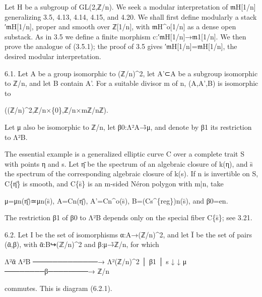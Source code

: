 \documentclass[11pt,a4paper]{article}
\begin{document}
Let H be a subgroup of GL(2,ℤ/n). We seek a modular interpretation of \ensuremath{\mathfrak{m}}\textunderscore{}H[1/n] generalizing 3.5, 4.13, 4.14, 4.15, and 4.20. We shall first define modularly a stack ′\ensuremath{\mathfrak{m}}\textunderscore{}H[1/n], proper and smooth over ℤ[1/n], with \ensuremath{\mathfrak{m}}\textunderscore{}H\textasciicircum{}o[1/n] as a dense open substack. As in 3.5 we define a finite morphism c:′\ensuremath{\mathfrak{m}}\textunderscore{}H[1/n]→\ensuremath{\mathfrak{m}}\textunderscore{}1[1/n]. We then prove the analogue of (3.5.1); the proof of 3.5 gives ′\ensuremath{\mathfrak{m}}\textunderscore{}H[1/n]=\ensuremath{\mathfrak{m}}\textunderscore{}H[1/n], the desired modular interpretation.

6.1. Let A be a group isomorphic to (ℤ/n)\textasciicircum{}2, let A'⊂A be a subgroup isomorphic to ℤ/n, and let B contain A'. For a suitable divisor m of n, (A,A',B) is isomorphic to

((ℤ/n)\textasciicircum{}2,ℤ/n×\{0\},ℤ/n×mℤ/nℤ).

Let μ also be isomorphic to ℤ/n, let β\textunderscore{}0:Λ²A→̃μ, and denote by β\textunderscore{}1 its restriction to Λ²B.

The essential example is a generalized elliptic curve C over a complete trait S with points η and s. Let η̄ be the spectrum of an algebraic closure of k(η), and s̄ the spectrum of the corresponding algebraic closure of k(s). If n is invertible on S, C\textunderscore{}\{η̄\} is smooth, and C\textunderscore{}\{s̄\} is an m-sided Néron polygon with m|n, take

μ=μ\textunderscore{}n(η̄)≃μ\textunderscore{}n(s̄), A=C\textunderscore{}n(η̄), A'=C\textunderscore{}n\textasciicircum{}o(s̄), B=(C\textunderscore{}s\textasciicircum{}\{reg\})\textunderscore{}n(s̄), and β\textunderscore{}0=e\textunderscore{}n.

The restriction β\textunderscore{}1 of β\textunderscore{}0 to Λ²B depends only on the special fiber C\textunderscore{}\{s̄\}; see 3.21.

6.2. Let I be the set of isomorphisms α:A→(ℤ/n)\textasciicircum{}2, and let Ī be the set of pairs (ᾱ,β), with ᾱ:B↪(ℤ/n)\textasciicircum{}2 and β:μ→̃ℤ/n, for which

Λ²ᾱ Λ²B  ─────────────→  Λ²(ℤ/n)\textasciicircum{}2 │ β\textunderscore{}1                    │ s ↓                        ↓ μ  ────────β────────→   ℤ/n

commutes. This is diagram (6.2.1).
\end{document}
